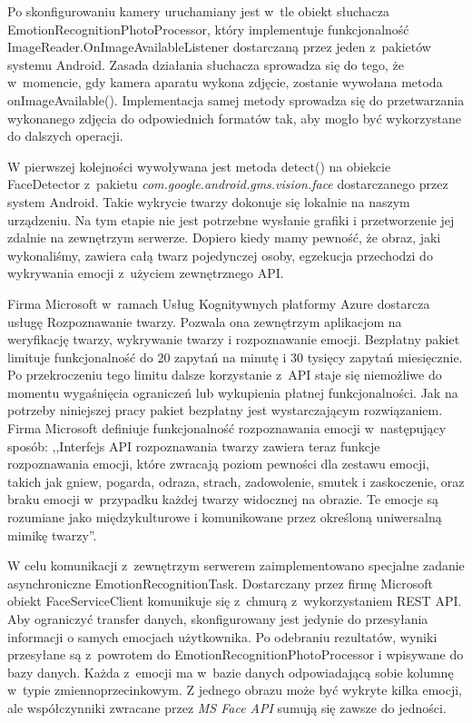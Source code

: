 Po skonfigurowaniu kamery uruchamiany jest w~tle obiekt słuchacza EmotionRecognitionPhotoProcessor, który implementuje funkcjonalność ImageReader.OnImageAvailableListener dostarczaną przez jeden z~pakietów systemu Android. Zasada działania słuchacza sprowadza się do tego, że w~momencie, gdy kamera aparatu wykona zdjęcie, zostanie wywołana metoda onImageAvailable(). Implementacja samej metody sprowadza się do przetwarzania wykonanego zdjęcia do odpowiednich formatów tak, aby mogło być wykorzystane do dalszych operacji.

W pierwszej kolejności wywoływana jest metoda detect() na obiekcie FaceDetector z~pakietu \textit{com.google.android.gms.vision.face} dostarczanego przez system Android. Takie wykrycie twarzy dokonuje się lokalnie na naszym urządzeniu. Na tym etapie nie jest potrzebne wysłanie grafiki i przetworzenie jej zdalnie na zewnętrzym serwerze. Dopiero kiedy mamy pewność, że obraz, jaki wykonaliśmy, zawiera całą twarz pojedynczej osoby, egzekucja przechodzi do wykrywania emocji z~użyciem zewnętrznego API.

Firma Microsoft w~ramach Usług Kognitywnych platformy Azure dostarcza usługę Rozpoznawanie twarzy. Pozwala ona zewnętrzym aplikacjom na weryfikację twarzy, wykrywanie twarzy i rozpoznawanie emocji. Bezpłatny pakiet limituje funkcjonalność do 20 zapytań na minutę i 30 tysięcy zapytań miesięcznie. Po przekroczeniu tego limitu dalsze korzystanie z~API staje się niemożliwe do momentu wygaśnięcia ograniczeń lub wykupienia płatnej funkcjonalności. Jak na potrzeby niniejszej pracy pakiet bezpłatny jest wystarczającym rozwiązaniem. Firma Microsoft definiuje funkcjonalność rozpoznawania emocji w~następujący sposób: ,,Interfejs API rozpoznawania twarzy zawiera teraz funkcje rozpoznawania emocji, które zwracają poziom pewności dla zestawu emocji, takich jak gniew, pogarda, odraza, strach, zadowolenie, smutek i zaskoczenie, oraz braku emocji w~przypadku każdej twarzy widocznej na obrazie. Te emocje są rozumiane jako międzykulturowe i komunikowane przez określoną uniwersalną mimikę twarzy''\cite{azure}.

W celu komunikacji z~zewnętrzym serwerem zaimplementowano specjalne zadanie asynchroniczne EmotionRecognitionTask. Dostarczany przez firmę Microsoft obiekt FaceServiceClient komunikuje się z~chmurą z~wykorzystaniem REST API. Aby ograniczyć transfer danych, skonfigurowany jest jedynie do przesyłania informacji o samych emocjach użytkownika. Po odebraniu rezultatów, wyniki przesyłane są z~powrotem do EmotionRecognitionPhotoProcessor i wpisywane do bazy danych. Każda z~emocji ma w~bazie danych odpowiadającą sobie kolumnę w~typie zmiennoprzecinkowym. Z jednego obrazu może być wykryte kilka emocji, ale współczynniki zwracane przez \textit{MS Face API} sumują się zawsze do jedności.


